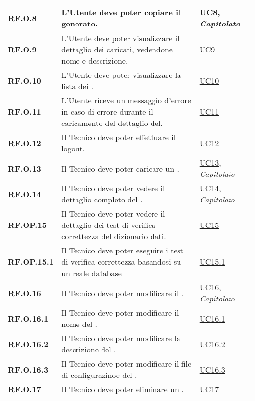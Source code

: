 \begin{longtable}{|P{3cm}|P{6,5cm}|>{\arraybackslash}P{4cm}|}
    \hline
    \textbf{RF.O.8} & L’Utente  deve poter copiare il  generato. &  \hyperref[UC8]{UC8}, \emph{Capitolato}\\
    \hline
    \textbf{RF.O.9} & L’Utente  deve poter visualizzare il dettaglio dei  caricati, vedendone nome e descrizione. &  \hyperref[UC9]{UC9}\\
    \hline
    \textbf{RF.O.10} & L’Utente  deve poter visualizzare la lista dei . &  \hyperref[UC10]{UC10}\\
    \hline
    \textbf{RF.O.11} & L’Utente  riceve un messaggio d'errore in caso di errore durante il caricamento del dettaglio del. &  \hyperref[UC11]{UC11}\\
    \hline
    \textbf{RF.O.12} & Il Tecnico deve poter effettuare il logout. &  \hyperref[UC12]{UC12}\\
    \hline
    \textbf{RF.O.13} & Il Tecnico deve poter caricare un . &  \hyperref[UC13]{UC13}, \emph{Capitolato}\\
    \hline
    \textbf{RF.O.14} & Il Tecnico deve poter vedere il dettaglio completo del . &  \hyperref[UC14]{UC14}, \emph{Capitolato}\\
    \hline
    \textbf{RF.OP.15} & Il Tecnico deve poter vedere il dettaglio dei test di verifica correttezza del dizionario dati. &  \hyperref[UC15]{UC15}\\
    \hline
    \textbf{RF.OP.15.1} & Il Tecnico deve poter eseguire i test di verifica correttezza basandosi su un reale database &  \hyperref[UC15point1]{UC15.1}\\
    \hline
    \textbf{RF.O.16} & Il Tecnico deve poter modificare il . &  \hyperref[UC16]{UC16}, \emph{Capitolato}\\
    \hline
    \textbf{RF.O.16.1} & Il Tecnico deve poter modificare il nome del . &  \hyperref[UC16point1]{UC16.1}\\
    \hline
    \textbf{RF.O.16.2} & Il Tecnico deve poter modificare la descrizione del . &  \hyperref[UC16point2]{UC16.2}\\
    \hline
    \textbf{RF.O.16.3} & Il Tecnico deve poter modificare il file di configurazinoe del . &  \hyperref[UC16point3]{UC16.3}\\
    \hline
    \textbf{RF.O.17} & Il Tecnico deve poter eliminare un . &  \hyperref[UC17]{UC17}\\

\end{longtable}
